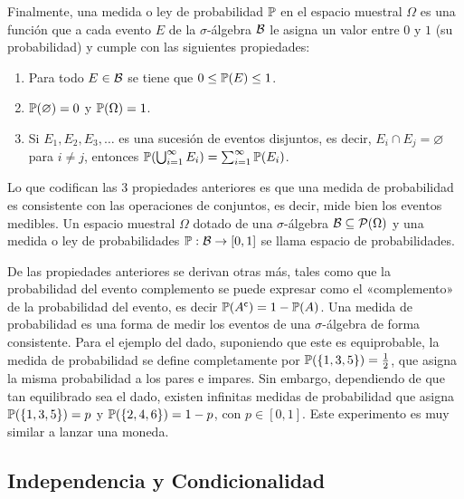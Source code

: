 Finalmente, una medida o ley de probabilidad \(\mathbb{P}\) en el espacio muestral \(\Omega\) es una función que a cada evento \(E\) de la \(\sigma\)-álgebra \(\mathcal{B}\) le asigna un valor entre \(0\) y \(1\) (su probabilidad) y cumple con las siguientes propiedades:
\begin{enumerate}
	\item Para todo \(E \in \mathcal{B}\) se tiene que \(0 \leq \mathbb{P}(E) \leq 1\).
	\item \(\mathbb{P}(\varnothing) = 0\) y \(\mathbb{P}(\Omega) = 1\).
	\item Si \(E_1, E_2, E_3, \dotsc\) es una sucesión de eventos disjuntos, es decir, \(E_i \cap E_j = \varnothing\) para \(i \neq j\), entonces \(\mathbb{P}(\bigcup_{i=1}^\infty E_i) = \sum_{i=1}^\infty \mathbb{P}(E_i)\).
\end{enumerate}

Lo que codifican las 3 propiedades anteriores es que una medida de probabilidad es consistente con las operaciones de conjuntos, es decir, mide bien los eventos medibles. Un espacio muestral \(\Omega\) dotado de una \(\sigma\)-álgebra \(\mathcal{B} \subseteq \mathcal{P}(\Omega)\) y una medida o ley de probabilidades \(\mathbb{P} : \mathcal{B} \to [0, 1]\) se llama espacio de probabilidades.

De las propiedades anteriores se derivan otras más, tales como que la probabilidad del evento complemento se puede expresar como el «complemento» de la probabilidad del evento, es decir \(\mathbb{P}(A^\mathsf{c}) = 1 - \mathbb{P}(A)\). Una medida de probabilidad es una forma de medir los eventos de una \(\sigma\)-álgebra de forma consistente. Para el ejemplo del dado, suponiendo que este es equiprobable, la medida de probabilidad se define completamente por \(\mathbb{P}(\{1, 3, 5\}) = \frac{1}{2}\), que asigna la misma probabilidad a los pares e impares. Sin embargo, dependiendo de que tan equilibrado sea el dado, existen infinitas medidas de probabilidad que asigna \(\mathbb{P}(\{1, 3, 5\}) = p\) y \(\mathbb{P}(\{2, 4, 6\}) = 1 - p\), con \(p \in [0, 1]\). Este experimento es muy similar a lanzar una moneda.


\subsection{Independencia y Condicionalidad}


